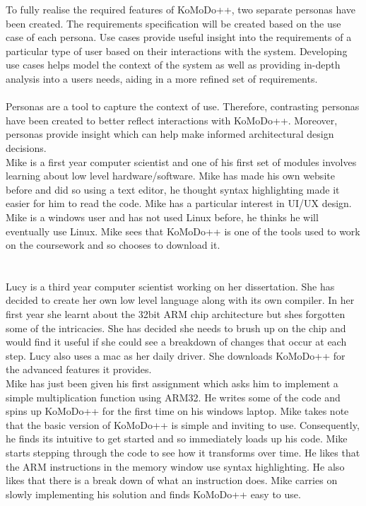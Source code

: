 To fully realise the required features of KoMoDo++, two separate personas have been created. The requirements specification will be created based on the use case of each persona. Use cases provide useful insight into the requirements of a particular type of user based on their interactions with the system. Developing use cases helps model the context of the system as well as providing in-depth analysis into a users needs, aiding in a more refined set of requirements.\\\\
%
Personas are a tool to capture the context of use. Therefore, contrasting personas have been created to better reflect interactions with KoMoDo++. Moreover, personas provide insight which can help make informed architectural design decisions.
%
\\
Mike is a first year computer scientist and one of his first set of modules involves learning about low level hardware/software. Mike has made his own website before and did so using a text editor, he thought syntax highlighting made it easier for him to read the code. Mike has a particular interest in UI/UX design. Mike is a windows user and has not used Linux before, he thinks he will eventually use Linux. Mike sees that KoMoDo++ is one of the tools used to work on the coursework and so chooses to download it.\\\\
%
\\
Lucy is a third year computer scientist working on her dissertation. She has decided to create her own low level language along with its own compiler. In her first year she learnt about the 32bit ARM chip architecture but shes forgotten some of the intricacies. She has decided she needs to brush up on the chip and would find it useful if she could see a breakdown of changes that occur at each step. Lucy also uses a mac as her daily driver. She downloads KoMoDo++ for the advanced features it provides.
%
\\
Mike has just been given his first assignment which asks him to implement a simple multiplication function using ARM32. He writes some of the code and spins up KoMoDo++ for the first time on his windows laptop. Mike takes note that the basic version of KoMoDo++ is simple and inviting to use. Consequently, he finds its intuitive to get started and so immediately loads up his code. Mike starts stepping through the code to see how it transforms over time. He likes that the ARM instructions in the memory window use syntax highlighting. He also likes that there is a break down of what an instruction does.  Mike carries on slowly implementing his solution and finds KoMoDo++ easy to use.\\\\
